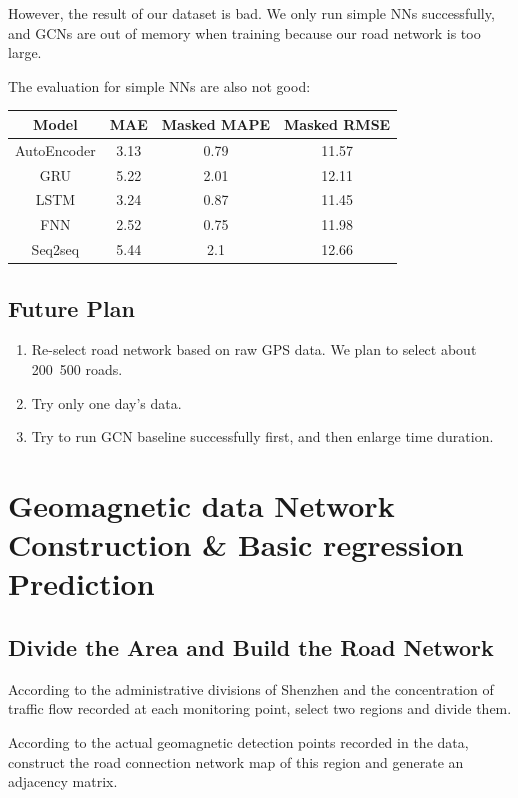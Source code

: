 \documentclass[fontset=none]{ctexart}
\theoremstyle{definition}
\theoremstyle{remark}
\begin{document}
However, the result of our dataset is bad.
We only run simple NNs successfully, and GCNs are out of memory when training because
our road network is too large.

The evaluation for simple NNs are also not good:
\begin{table}[htb]
  \centering
  \begin{tabular}{|c|c|c|c|}
  \hline
      Model & MAE & Masked MAPE & Masked RMSE\\ \hline
      AutoEncoder & 3.13 & 0.79 & 11.57\\ 
      GRU & 5.22 & 2.01 & 12.11\\ 
      LSTM & 3.24 & 0.87 & 11.45\\ 
      FNN & 2.52 & 0.75 & 11.98\\ 
      Seq2seq & 5.44 & 2.1 & 12.66\\
  \hline
  \end{tabular}
\end{table}

\subsection{Future Plan}
\begin{enumerate}
  \item Re-select road network based on raw GPS data. We plan to select about 200~500 roads.
  \item Try only one day's data.
  \item Try to run GCN baseline successfully first, and then enlarge time duration.
\end{enumerate}

\clearpage
\section{Geomagnetic data Network Construction \& Basic regression Prediction}
\subsection{Divide the Area and Build the Road Network}
According to the administrative divisions of Shenzhen and the concentration of traffic flow recorded at each monitoring point, select two regions and divide them.

According to the actual geomagnetic detection points recorded in the data, construct the road connection network map of this region and generate an adjacency matrix.
\end{document}

